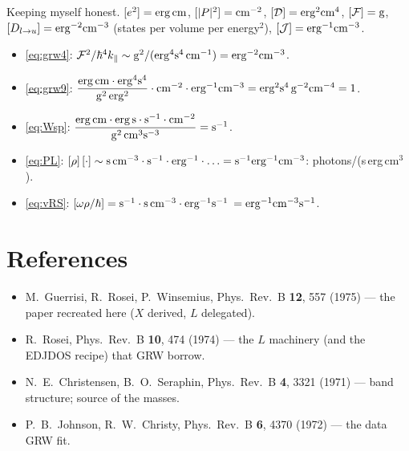 \documentclass[11pt,a4paper]{article}
\numberwithin{equation}{section}
\newcommand{\cD}{\mathcal{D}}
\newcommand{\cF}{\mathcal{F}}
\newcommand{\cJ}{\mathcal{J}}%
\newcommand{\kpar}{k_{\parallel}}
\begin{document}
Keeping myself honest. $[e^2]={\rm erg\,cm}$, $[|P|^2]={\rm cm^{-2}}$,
$[\cD]={\rm erg^2cm^4}$, $[\cF]={\rm g}$,
$[D_{l\to u}]={\rm erg^{-2}cm^{-3}}$ (states per volume per
energy$^2$), $[\cJ]={\rm erg^{-1}cm^{-3}}$.
\begin{itemize}
\item \eqref{eq:grw4}:
$\cF^2/\hbar^4\kpar\sim{\rm g^2}/({\rm erg^4s^4\,cm^{-1}})
={\rm erg^{-2}cm^{-3}}$.\ \checkmark
\item \eqref{eq:grw9}:
$\dfrac{{\rm erg\,cm}\cdot{\rm erg^4s^4}}{{\rm g^2\,erg^2}}
\cdot{\rm cm^{-2}}\cdot{\rm erg^{-1}cm^{-3}}
={\rm erg^2s^4\,g^{-2}cm^{-4}}=1$.\ \checkmark
\item \eqref{eq:Wsp}:
$\dfrac{{\rm erg\,cm}\cdot{\rm erg\,s}\cdot{\rm s^{-1}}\cdot{\rm cm^{-2}}}
{{\rm g^2\,cm^3s^{-3}}}={\rm s^{-1}}$.\ \checkmark
\item \eqref{eq:PL}: $[\rho]\,[\cdot]\sim{\rm s\,cm^{-3}}\cdot
{\rm s^{-1}}\cdot{\rm erg^{-1}}\cdot\ldots
={\rm s^{-1}erg^{-1}cm^{-3}}$: photons/(s\,erg\,cm$^3$).\ \checkmark
\item \eqref{eq:vRS}: $[\omega\rho/\hbar]
={\rm s^{-1}}\cdot{\rm s\,cm^{-3}}\cdot{\rm erg^{-1}s^{-1}}$
$={\rm erg^{-1}cm^{-3}s^{-1}}$.\ \checkmark
\end{itemize}

\section*{References}
\begin{itemize}
\item M.~Guerrisi, R.~Rosei, P.~Winsemius, Phys.\ Rev.\ B
\textbf{12}, 557 (1975) --- the paper recreated here ($X$ derived,
$L$ delegated).
\item R.~Rosei, Phys.\ Rev.\ B \textbf{10}, 474 (1974) --- the $L$
machinery (and the EDJDOS recipe) that GRW borrow.
\item N.~E.~Christensen, B.~O.~Seraphin, Phys.\ Rev.\ B \textbf{4},
3321 (1971) --- band structure; source of the masses.
\item P.~B.~Johnson, R.~W.~Christy, Phys.\ Rev.\ B \textbf{6}, 4370
(1972) --- the data GRW fit.
\end{itemize}
\end{document}
